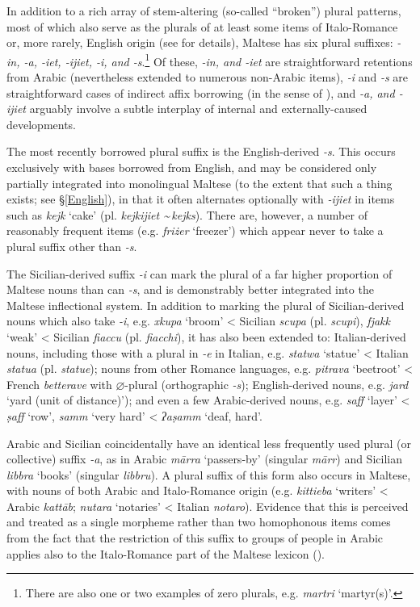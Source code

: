 \documentclass[output=paper]{langsci/langscibook}
\begin{document}
In addition to a rich array of stem-altering (so-called ``broken'') plural patterns, most of which also serve as the plurals of at least some items of Italo-Romance or, more rarely, English origin (see \citealt{spagnol2011} for details), Maltese has six plural suffixes: \textit{-in, -a, -iet, -ijiet, -i, \textnormal{and} -s}.\footnote{There are also one or two examples of zero plurals, e.g. \textit{martri} `martyr(s)'.} Of these, \textit{-in, \textnormal{and} -iet} are straightforward retentions from Arabic (nevertheless extended to numerous non-Arabic items), \textit{-i} and \textit{-s} are straightforward cases of indirect affix borrowing (in the sense of \citealt{Seifart2015}), and \textit{-a, \textnormal{and} -ijiet} arguably involve a subtle interplay of internal and externally-caused developments.

The most recently borrowed plural suffix is the English-derived \textit{-s}. This occurs exclusively with bases borrowed from English, and may be considered only partially integrated into monolingual Maltese (to the extent that such a thing exists; see §\ref{English}), in that it often alternates optionally with \textit{-ijiet} in items such as \textit{kejk} `cake' (pl. \textit{kejkijiet \textasciitilde \,kejks}). There are, however, a number of reasonably frequent items (e.g. \textit{friżer} `freezer') which appear never to take a plural suffix other than \textit{-s}.

The Sicilian-derived suffix \textit{-i} can mark the plural of a far higher proportion of Maltese nouns than can \textit{-s}, and is demonstrably better integrated into the Maltese inflectional system. In addition to marking the plural of Sicilian-derived nouns which also take \textit{-i}, e.g. \textit{xkupa} `broom' < Sicilian \textit{scupa} (pl. \textit{scupi}), \textit{fjakk} `weak' < Sicilian \textit{fiaccu} (pl. \textit{fiacchi}), it has also been extended to: Italian-derived nouns, including those with a plural in \textit{-e} in Italian, e.g. \textit{statwa} `statue' < Italian \textit{statua} (pl. \textit{statue}); nouns from other Romance languages, e.g. \textit{pitrava} `beetroot' < French \textit{betterave} with $\varnothing$-plural (orthographic \textit{-s}); English-derived nouns, e.g. \textit{jard} `yard (unit of distance)'); and even a few Arabic-derived nouns, e.g. \textit{saff} `layer' < \textit{\d{s}aff} `row', \textit{samm} `very hard' < \textit{ʔa\d{s}amm} `deaf, hard'. 

Arabic and Sicilian coincidentally have an identical less frequently used plural (or collective) suffix \textit{-a}, as in Arabic \textit{m\={a}rra} `passers-by' (singular \textit{m\={a}rr}) and Sicilian \textit{libbra} `books' (singular \textit{libbru}). A plural suffix of this form also occurs in Maltese, with nouns of both Arabic and Italo-Romance origin (e.g. \textit{kittieba} `writers' < Arabic \textit{katt\={a}b}; \textit{nutara} `notaries' < Italian \textit{notaro}). Evidence that this is perceived and treated as a single morpheme rather than two homophonous items comes from the fact that the restriction of this suffix to groups of people in Arabic applies also to the Italo-Romance part of the Maltese lexicon (\citealt{mifsud2011}). 
\end{document}
